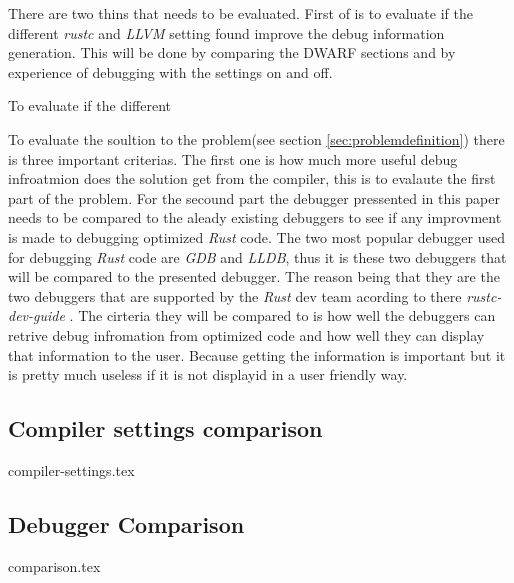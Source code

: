 

There are two thins that needs to be evaluated.
First of is to evaluate if the different \emph{rustc} and \emph{LLVM} setting found improve the debug information generation.
This will be done by comparing the \gls{DWARF} sections and by experience of debugging with the settings on and off.


To evaluate if the different 

To evaluate the soultion to the problem(see section \ref{sec:problemdefinition}) there is three important criterias.
The first one is how much more useful debug infroatmion does the solution get from the compiler, this is to evalaute the first part of the problem. 
For the secound part the debugger pressented in this paper needs to be compared to the aleady existing debuggers to see if any improvment is made to debugging optimized \emph{Rust} code.
The two most popular debugger used for debugging \emph{Rust} code are \emph{GDB} and \emph{LLDB}, thus it is these two debuggers that will be compared to the presented debugger.
The reason being that they are the two debuggers that are supported by the \emph{Rust} dev team acording to there \emph{rustc-dev-guide} \cite{rust-dev-guide}.
The cirteria they will be compared to is how well the debuggers can retrive debug infromation from optimized code and how well they can display that information to the user.
Because getting the information is important but it is pretty much useless if it is not displayid in a user friendly way.


\subsection{Compiler settings comparison}
\label{sec:settingscomparison}
{compiler-settings.tex}


\subsection{Debugger Comparison}
\label{sec:debuggercomparison}
{comparison.tex}

